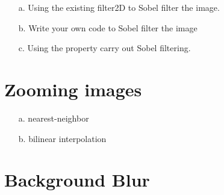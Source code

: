 \documentclass[12pt,a4paper]{article}
\begin{document}
    \begin{enumerate}
        \item[a.] Using the existing filter2D to Sobel filter the image.
        
        
        \item[b.] Write your own code to Sobel filter the image
        
        
        \item[c.] Using the property carry out Sobel filtering. 
        
    \end{enumerate}

\section{Zooming images}

    \begin{enumerate}
        \item[a.] nearest-neighbor
        

        \item[b.] bilinear interpolation
        
        
    \end{enumerate}

\section{Background Blur}
\end{document}
